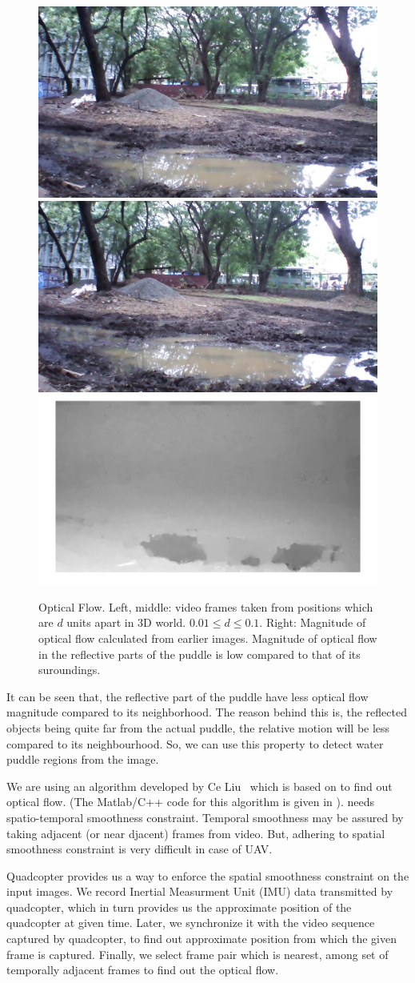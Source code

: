 \documentclass[times,10pt,twocolumn,letterpaper]{article}
\begin{document}
\begin{figure}[h!]
\centering
\includegraphics[width=0.3\linewidth]{images/IMG_PAIR_1_1.jpg}
\includegraphics[width=0.3\linewidth]{images/IMG_PAIR_1_2.jpg}
\includegraphics[width=0.3\linewidth]{images/optical_flow_magnitude.jpg}
\caption{Optical Flow. Left, middle: video frames taken from positions
which are $d$ units apart in 3D world. $ 0.01 \leq d \leq 0.1$. Right:
Magnitude of optical flow calculated from earlier images. Magnitude of optical
flow in the reflective parts of the puddle is low compared to that of its
suroundings.}
\label{fig:optical_flow}
\end{figure}

It can be seen that, the reflective part of the puddle have less optical flow
magnitude compared to its neighborhood. The reason behind this is, the
reflected objects being quite far from the actual puddle, the relative motion
will be less compared to its neighbourhood. So, we can use this property to
detect water puddle regions from the image.

We are using an algorithm  developed by Ce Liu~\cite{Liu11Thesis} which is based
on \cite{Brox04,Bruhn05} to find out optical flow. (The Matlab/C++ code for this
algorithm is given in \cite{Liu11}). \cite{Brox04} needs spatio-temporal
smoothness constraint. Temporal smoothness may be assured by taking adjacent (or
near djacent) frames from video. But, adhering to spatial smoothness constraint
is very difficult in case of UAV. 

Quadcopter provides us a way to enforce the spatial smoothness constraint on
the input images. We record Inertial Measurment Unit (IMU) data
transmitted by quadcopter, which in turn provides us the approximate position of
the quadcopter at given time. Later, we synchronize it with the video sequence
captured by quadcopter, to find out approximate position from which the given
frame is captured. Finally, we select frame pair which is nearest, among set of
temporally adjacent frames to find out the optical flow.
\end{document}

